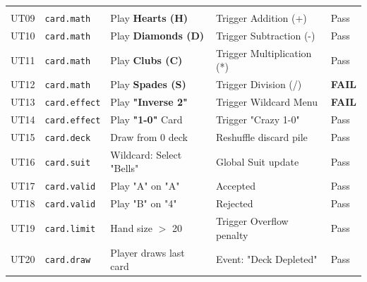 \documentclass[12pt, titlepage]{article}
\begin{document}
\begin{small}
\begin{xltabular}{\textwidth}{l p{2.2cm} X X l}
            \midrule
              \\
            UT09 & \texttt{card.math} & Play \textbf{Hearts (H)} & Trigger Addition (+) & Pass \\
            UT10 & \texttt{card.math} & Play \textbf{Diamonds (D)} & Trigger Subtraction (-) & Pass \\
            UT11 & \texttt{card.math} & Play \textbf{Clubs (C)} & Trigger Multiplication (*) & Pass \\
            UT12 & \texttt{card.math} & Play \textbf{Spades (S)} & Trigger Division (/) & \textbf{FAIL} \\
            UT13 & \texttt{card.effect} & Play \textbf{"Inverse 2"} & Trigger Wildcard Menu & \textbf{FAIL} \\
            UT14 & \texttt{card.effect} & Play \textbf{"1-0"} Card & Trigger "Crazy 1-0" & Pass \\
            UT15 & \texttt{card.deck} & Draw from 0 deck & Reshuffle discard pile & Pass \\
            UT16 & \texttt{card.suit} & Wildcard: Select "Bells" & Global Suit update & Pass \\
            UT17 & \texttt{card.valid} & Play "A" on "A" & Accepted & Pass \\
            UT18 & \texttt{card.valid} & Play "B" on "4" & Rejected & Pass \\
            UT19 & \texttt{card.limit} & Hand size $>$ 20 & Trigger Overflow penalty & Pass \\
            UT20 & \texttt{card.draw} & Player draws last card & Event: "Deck Depleted" & Pass \\


\end{xltabular}
\end{small}
\end{document}
